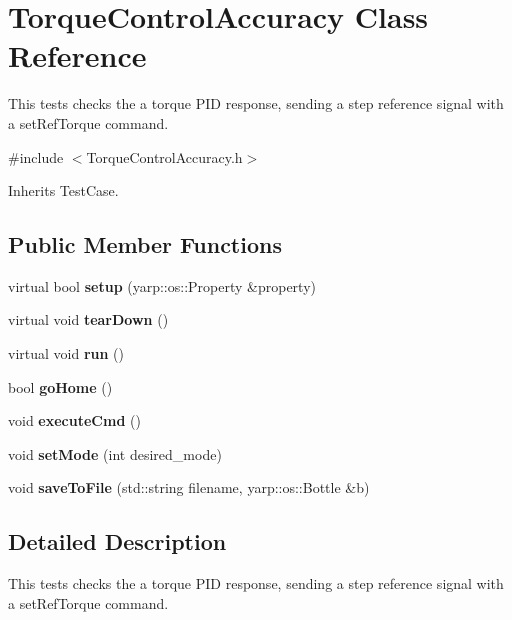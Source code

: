 \section{Torque\+Control\+Accuracy Class Reference}
\label{classTorqueControlAccuracy}


This tests checks the a torque P\+ID response, sending a step reference signal with a set\+Ref\+Torque command.  




{\ttfamily \#include $<$Torque\+Control\+Accuracy.\+h$>$}



Inherits Test\+Case.

\subsection*{Public Member Functions}
\begin{DoxyCompactItemize}
\item 
\mbox{\label{classTorqueControlAccuracy_a1f3e69c138869defb9650a8419df5cda}} 
virtual bool {\bfseries setup} (yarp\+::os\+::\+Property \&property)
\item 
\mbox{\label{classTorqueControlAccuracy_ae33e8f69b2d85ce6a0a8e44da2e7c35f}} 
virtual void {\bfseries tear\+Down} ()
\item 
\mbox{\label{classTorqueControlAccuracy_a7a66c140c54e15ee9ec99ae9ee612de1}} 
virtual void {\bfseries run} ()
\item 
\mbox{\label{classTorqueControlAccuracy_a696a9ca098b4f8503bc00bfd38220b59}} 
bool {\bfseries go\+Home} ()
\item 
\mbox{\label{classTorqueControlAccuracy_a4cc80a5a67cd30324a43edaacdc57b63}} 
void {\bfseries execute\+Cmd} ()
\item 
\mbox{\label{classTorqueControlAccuracy_a5e4873980d651c4338206ef198e0478a}} 
void {\bfseries set\+Mode} (int desired\+\_\+mode)
\item 
\mbox{\label{classTorqueControlAccuracy_ac1584b48a23e8bbcc6069fcdd75f5215}} 
void {\bfseries save\+To\+File} (std\+::string filename, yarp\+::os\+::\+Bottle \&b)
\end{DoxyCompactItemize}


\subsection{Detailed Description}
This tests checks the a torque P\+ID response, sending a step reference signal with a set\+Ref\+Torque command. 

